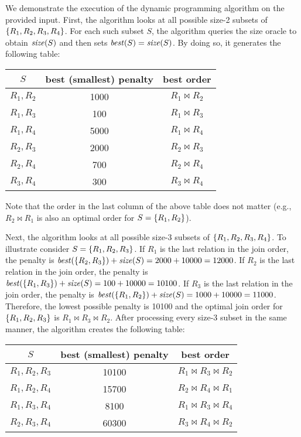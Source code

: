 \begin{sol}
     We demonstrate the execution of the dynamic programming algorithm on the provided input. First, the algorithm looks at all possible size-2 subsets of $\{R_1, R_2, R_3, R_4\}$. For each such subset $S$, the algorithm queries the size oracle to obtain $\mathit{size}(S)$ and then sets $\mathit{best}(S) = \mathit{size}(S)$. By doing so, it generates the following table:

    \begin{center}
    \begin{tabular}{c|c|c}
        $S$ & best (smallest) penalty & best order\\
        \hline
        $R_1,R_2$ & 1000 & $R_1 \bowtie R_2$ \\
        $R_1,R_3$ & 100 & $R_1 \bowtie R_3$\\
        $R_1,R_4$ & 5000 & $R_1 \bowtie R_4$\\
        $R_2,R_3$ & 2000 & $R_2 \bowtie R_3$\\
        $R_2,R_4$ & 700 & $R_2 \bowtie R_4$\\
        $R_3,R_4$ & 300 & $R_3 \bowtie R_4$
    \end{tabular}
    \end{center}

    \noindent Note that the order in the last column of the above table does not matter (e.g., $R_2 \bowtie R_1$ is also an optimal order for $S = \{R_1, R_2\}$).

    \vgap

    Next, the algorithm looks at all possible size-3 subsets of $\{R_1, R_2, R_3, R_4\}$. To illustrate consider $S = \{R_1, R_2, R_3\}$. If $R_1$ is the last relation in the join order, the  penalty is $\mathit{best}(\{R_2, R_3\}) + \mathit{size}(S) = 2000 + 10000 = 12000$. If $R_2$ is the last relation in the join order, the penalty is $\mathit{best}(\{R_1, R_3\}) + \mathit{size}(S) = 100 + 10000 = 10100$. If $R_3$ is the last relation in the join order, the penalty is $\mathit{best}(\{R_1, R_2\}) + \mathit{size}(S) = 1000 + 10000 = 11000$. Therefore, the lowest possible penalty is 10100 and the optimal join order for $\{R_1, R_2, R_3\}$ is $R_1 \bowtie R_3 \bowtie R_2$. After processing every size-3 subset in the same manner, the algorithm creates the following table:

        \begin{center}
    \begin{tabular}{c|c|c}
        $S$ & best (smallest) penalty & best order\\
        \hline
        $R_1,R_2,R_3$ & 10100 & $R_1 \bowtie R_3 \bowtie R_2$ \\
        $R_1,R_2,R_4$ & 15700 & $R_2 \bowtie R_4 \bowtie R_1$\\
        $R_1,R_3,R_4$ & 8100 & $R_1 \bowtie R_3 \bowtie R_4$\\
        $R_2,R_3,R_4$ & 60300 & $R_3 \bowtie R_4 \bowtie R_2$
    \end{tabular}
    \end{center}


\end{sol}
